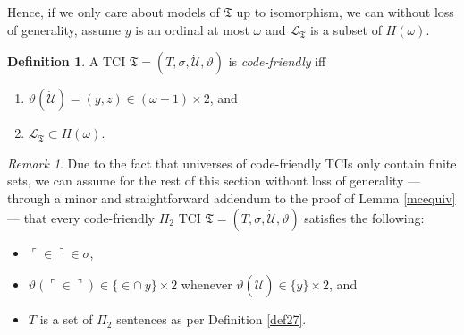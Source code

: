 \documentclass[12pt, twoside]{memoir}
\numberwithin{equation}{section}
\theoremstyle{definition}
\newtheorem{defi}[thm]{Definition}
\theoremstyle{remark}
\newtheorem{rem}[thm]{Remark}
\theoremstyle{definition}
\theoremstyle{definition}
\theoremstyle{definition}
\theoremstyle{remark}
\begin{document}
Hence, if we only care about models of $\mathfrak{T}$ up to isomorphism, we can without loss of generality, assume $y$ is an ordinal at most $\omega$ and $\mathcal{L}_{\mathfrak{T}}$ is a subset of $H(\omega)$.

\begin{defi}
A TCI $\mathfrak{T} = (T, \sigma, \dot{\mathcal{U}}, \vartheta)$ is \emph{code-friendly} iff 
\begin{enumerate}[label=(\alph*)]
    \item $\vartheta(\dot{\mathcal{U}}) = (y, z) \in (\omega + 1) \times 2$, and 
    \item $\mathcal{L}_{\mathfrak{T}} \subset H(\omega)$.
\end{enumerate}
\end{defi}

\begin{rem}\label{rem6318}
Due to the fact that universes of code-friendly TCIs only contain finite sets, we can assume for the rest of this section without loss of generality --- through a minor and straightforward addendum to the proof of Lemma \ref{mcequiv} --- that every code-friendly $\Pi_2$ TCI $\mathfrak{T} = (T, \sigma, \dot{\mathcal{U}}, \vartheta)$ satisfies the following:
\begin{itemize}
    \item $\ulcorner \in \urcorner \in \sigma$,
    \item $\vartheta(\ulcorner \in \urcorner) \in \{\in \cap \ y\} \times 2$ whenever $\vartheta(\dot{\mathcal{U}}) \in \{y\} \times 2$, and
    \item $T$ is a set of $\Pi_2$ sentences as per Definition \ref{def27}.
\end{itemize}
\end{rem}
\end{document}
